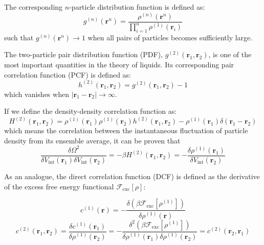The corresponding $n$-particle distribution function is defined as:
\begin{equation}
g^{(n)}(\mathbf{r}^{n})=\dfrac{\rho^{(n)}(\mathbf{r}^{n})}{\prod_{i=1}^{n}\rho^{(1)}(\mathbf{r}_{i})}
\end{equation}
such that $g^{(n)}(\mathbf{r}^{n})\rightarrow1$ when all pairs of
particles becomes sufficiently large.

The two-particle pair distribution function (\acs{PDF}), $g^{(2)}(\mathbf{r}_{1},\mathbf{r}_{2})$,
is one of the most important quantities in the theory of liquids. Its corresponding pair correlation function (\acs{PCF}) is defined
as:
\begin{equation}
h^{(2)}(\mathbf{r}_{1},\mathbf{r}_{2})=g^{(2)}(\mathbf{r}_{1},\mathbf{r}_{2})-1
\end{equation}
which vanishes when $\left|\mathbf{r}_{1}-\mathbf{r}_{2}\right|\rightarrow\infty$.

If we define the density-density correlation function as: 
\begin{equation}
H^{(2)}(\mathbf{r}_{1},\mathbf{r}_{2})=\rho^{(1)}(\mathbf{r}_{1})\rho^{(1)}(\mathbf{r}_{2})h^{(2)}(\mathbf{r}_{1},\mathbf{r}_{2})-\rho^{(1)}(\mathbf{r}_{1})\delta(\mathbf{r}_{1}-\mathbf{r}_{2})\label{eq:H-definition}
\end{equation}
which means the correlation \citep{Correlation_function_wiki} between
the instantaneous fluctuation of particle density from its ensemble
average, it can be proven that
\begin{equation}
\dfrac{\delta\Omega^{2}}{\delta V_{\mathrm{int}}(\mathbf{r}_{1})\delta V_{\mathrm{int}}(\mathbf{r}_{2})}=-\beta H^{(2)}(\mathbf{r}_{1},\mathbf{r}_{2})=-\dfrac{\delta\rho^{(1)}(\mathbf{r}_{1})}{\delta V_{\mathrm{int}}(\mathbf{r}_{2})}
\end{equation}

As an analogue, the direct correlation function (\acs{DCF}) is defined
as the derivative of the excess free energy functional $\mathcal{F}_{\mathrm{exc}}[\rho]$:

\begin{equation}
c^{(1)}(\mathbf{r})=-\dfrac{\delta(\beta\mathcal{F}_{\mathrm{exc}}[\rho^{(1)}])}{\delta\rho^{(1)}(\mathbf{r})}\label{eq:def-dcf}
\end{equation}
\begin{equation}
c^{(2)}(\mathbf{r}_{1},\mathbf{r}_{2})=\dfrac{\delta c^{(1)}(\mathbf{r}_{1})}{\delta\rho^{(1)}(\mathbf{r}_{2})}=-\dfrac{\delta^{2}(\beta\mathcal{F}_{\mathrm{exc}}[\rho^{(1)}])}{\delta\rho^{(1)}(\mathbf{r}_{1})\delta\rho^{(1)}(\mathbf{r}_{2})}=c^{(2)}(\mathbf{r}_{2},\mathbf{r}_{1})
\end{equation}

